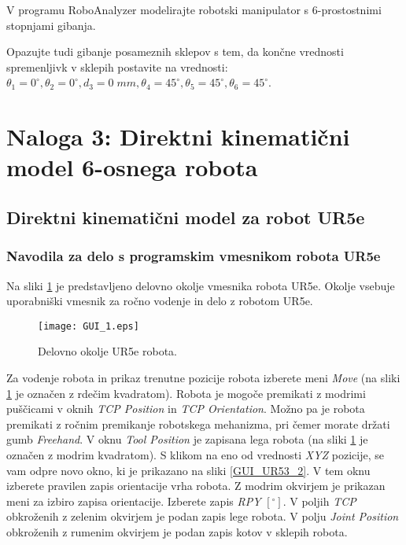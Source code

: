 V programu RoboAnalyzer modelirajte robotski manipulator s 6-prostostnimi stopnjami
gibanja.

Opazujte tudi gibanje posameznih sklepov s tem, da končne vrednosti
spremenljivk v sklepih postavite na vrednosti: $\theta_1 = 0 ^\circ , \theta_2 = 0
^\circ , d_3 = 0 \; mm, \theta_4 = 45 ^\circ , \theta_5 = 45 ^\circ , \theta_6 = 45 ^\circ $.

\section{Naloga 3: Direktni kinematični model 6-osnega robota}

\subsection{Direktni kinematični model za robot UR5e}

\subsubsection{Navodila za delo s programskim vmesnikom robota UR5e}

Na sliki \ref{delovno_okolje} je predstavljeno delovno okolje vmesnika robota UR5e. Okolje vsebuje  uporabniški vmesnik  za ročno vodenje in delo z robotom UR5e.
\begin{figure}[h]
\centering
\texttt{[image: GUI\_1.eps]}
  \caption{\label{delovno_okolje} Delovno okolje UR5e robota.}
\end{figure}

Za vodenje robota in prikaz trenutne pozicije robota izberete meni \emph{Move} (na sliki \ref{delovno_okolje} je označen z rdečim kvadratom). Robota je mogoče premikati z modrimi puščicami v oknih \emph{TCP Position} in \emph{TCP Orientation}. Možno pa je robota premikati z ročnim premikanje robotskega mehanizma, pri čemer morate držati gumb \emph{Freehand}. V oknu \emph{Tool Position} je zapisana lega robota (na sliki \ref{delovno_okolje} je označen z modrim kvadratom). S klikom na eno od vrednosti \emph{XYZ} pozicije, se vam odpre novo okno, ki je prikazano na sliki \ref{GUI_UR53_2}. V tem oknu izberete pravilen zapis orientacije vrha robota. Z modrim okvirjem je prikazan meni za izbiro zapisa orientacije. Izberete zapis \emph{RPY} $\left[ ^\circ \right]$. V poljih \emph{TCP} obkroženih z zelenim okvirjem je podan zapis lege robota. V polju \emph{Joint Position} obkroženih z rumenim okvirjem je podan zapis kotov v sklepih robota.


